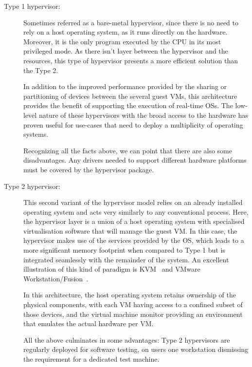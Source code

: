 \begin{description}
	\item [Type 1 hypervisor:] Sometimes referred as a bare-metal hypervisor, since there is no need to rely on a host operating system, as it runs directly on the hardware. Moreover, it is the only program executed by the CPU in its most privileged mode. As there isn't layer between the hypervisor and the resources, this type of hypervisor presents a more efficient solution than the Type 2.

	In addition to the improved performance provided by the sharing or partitioning of devices between the several guest VMs, this architecture provides the benefit of supporting the execution of real-time OSs. The low-level nature of these hypervisors with the broad access to the hardware has proven useful for use-cases that need to deploy a multiplicity of operating systems.
	
	Recognizing all the facts above, we can point that there are also some disadvantages. Any drivers needed to support different hardware platforms must be covered by the hypervisor package.
	
	\item [Type 2 hypervisor:] This second variant of the hypervisor model relies on an already installed operating system and acts very similarly to any conventional process. Here, the hypervisor layer is a union of a host operating system with specialised virtualisation software that will manage the guest VM. In this case, the hypervisor makes use of the services provided by the OS, which leads to a more significant memory footprint when compared to Type 1 but is integrated seamlessly with the remainder of the system. An excellent illustration of this kind of paradigm is \gls{KVM}~\cite{Kivity2007} and VMware Workstation/Fusion~\cite{Agesen2010}.
	
	In this architecture, the host operating system retains ownership of the physical components, with each VM having access to a confined subset of those devices, and the virtual machine monitor providing an environment that emulates the actual hardware per VM. 
	
	All the above culminates in some advantages: Type 2 hypervisors are regularly deployed for software testing, on users one workstation dismissing the requirement for a dedicated test machine. 
\end{description}

